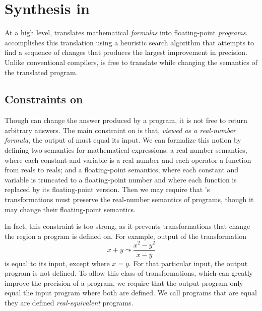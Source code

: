 \documentclass[paper.tex]{subfiles}
\begin{document}
\section{Synthesis in \casio}
\label{sec:synthesis}

At a high level, \casio translates mathematical \emph{formulas}
  into floating-point \emph{programs}.
\casio accomplishes this translation using a heuristic search algorithm
  that attempts to find a sequence of changes
  that produces the largest improvement in precision.
Unlike conventional compilers,
  \casio is free to translate while changing
  the semantics of the translated program.

\subsection{Constraints on \casio}

Though \casio can change the answer produced by a program,
  it is not free to return arbitrary answers.
The main constraint on \casio
  is that, \emph{viewed as a real-number formula},
  the output of \casio must equal its input.
We can formalize this notion by defining
  two semantics for mathematical expressions:
  a real-number semantics,
  where each constant and variable is a real number
  and each operator a function from reals to reals;
  and a floating-point semantics,
  where each constant and variable is truncated
  to a floating-point number
  and where each function is replaced by its floating-point version.
Then we may require that \casio's transformations
  must preserve the real-number semantics of programs,
  though it may change their floating-point semantics.

In fact, this constraint is too strong,
  as it prevents transformations that change
  the region a program is defined on.
For example, output of the transformation
\[
  x + y \leadsto \frac{x^2 - y^2}{x - y}
\]
  is equal to its input, except where $x = y$.
For that particular input, the output program is not defined.
To allow this class of transformations,
  which can greatly improve the precision of a program,
  we require that the output program
  only equal the input program where both are defined.
We call programs that are equal they are defined \emph{real-equivalent} programs.
\end{document}
